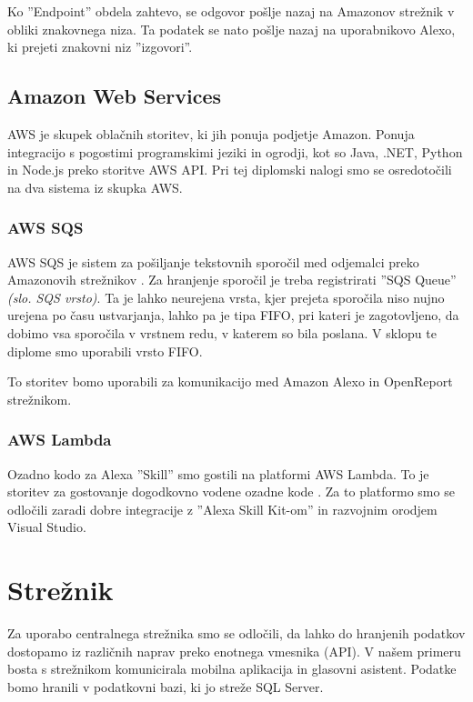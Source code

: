 \documentclass[a4paper, 12pt]{book}
\begin{document}
Ko ''Endpoint'' obdela zahtevo, se odgovor pošlje nazaj na Amazonov strežnik v obliki znakovnega niza.
Ta podatek se nato pošlje nazaj na uporabnikovo Alexo, ki prejeti znakovni niz ''izgovori''.

\subsection{Amazon Web Services}

AWS je skupek oblačnih storitev, ki jih ponuja podjetje Amazon.
Ponuja integracijo s pogostimi programskimi jeziki in ogrodji, kot so Java, .NET, Python in Node.js preko storitve AWS API.
Pri tej diplomski nalogi smo se osredotočili na dva sistema iz skupka AWS.

\subsubsection{AWS SQS}

AWS SQS je sistem za pošiljanje tekstovnih sporočil med odjemalci preko Amazonovih strežnikov \cite{sqs}.
Za hranjenje sporočil je treba registrirati ''SQS Queue'' \textit{(slo. SQS vrsto)}. 
Ta je lahko neurejena vrsta, kjer prejeta sporočila niso nujno urejena po času ustvarjanja, lahko pa je tipa FIFO, pri kateri je zagotovljeno, da dobimo vsa sporočila v vrstnem redu, v katerem so bila poslana.
V sklopu te diplome smo uporabili vrsto FIFO.

To storitev bomo uporabili za komunikacijo med Amazon Alexo in OpenReport strežnikom.

\subsubsection{AWS Lambda}

Ozadno kodo za Alexa ''Skill'' smo gostili na platformi AWS Lambda.
To je storitev za gostovanje dogodkovno vodene ozadne kode \cite{lambda}.
Za to platformo smo se odločili zaradi dobre integracije z ''Alexa Skill Kit-om'' in razvojnim orodjem Visual Studio.

\section{Strežnik}

Za uporabo centralnega strežnika smo se odločili, da lahko do hranjenih podatkov dostopamo iz različnih naprav preko enotnega vmesnika (API).
V našem primeru bosta s strežnikom komunicirala mobilna aplikacija in glasovni asistent.
Podatke bomo hranili v podatkovni bazi, ki jo streže SQL Server.
\end{document}
